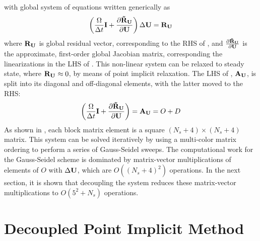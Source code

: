 with global system of equations written generically as
\begin{equation}
  \left( \frac{\Omega}{\Delta t} \mathbf I + \frac{\partial \mathbf{\tilde{R}_{\mathbf U}}}{\partial \mathbf U} \right)\Delta \mathbf U = \mathbf R_{{\mathbf U}_{}}
  \label{fc-global}
\end{equation}
where $\mathbf R_{{\mathbf U}_{}}$ is global residual vector, corresponding to the RHS of
, and $\frac{\partial \mathbf{\tilde{R}_{\mathbf U}}}{\partial \mathbf U}$ is the approximate, first-order global
Jacobian matrix, corresponding the linearizations in the LHS of
. This non-linear system can be relaxed to steady state, where
$\mathbf R_{{\mathbf U}_{}} \approx 0$, by means of point implicit relaxation.  The LHS of
, $\mathbf A_{\mathbf U}$, is split into its diagonal and off-diagonal
elements, with the latter moved to the RHS:
\begin{equation}
  \left( \frac{\Omega}{\Delta t} \mathbf I + \frac{\partial \mathbf{\tilde{R}_{\mathbf U}}}{\partial \mathbf U} \right) = 
  \mathbf A_{\mathbf U} = O+D
  \label{decomp-jac}
\end{equation}
As shown in , each block matrix element is a square
$(N_s+4)\times(N_s+4)$ matrix.  This system can be solved iteratively by using a
multi-color matrix ordering to perform a series of Gauss-Seidel sweeps. The
computational work for the Gauss-Seidel scheme is dominated by matrix-vector
multiplications of elements of $O$ with $\Delta \mathbf U$, which are $O((N_s + 4)^2)$
operations.  In the next section, it is shown that decoupling the system reduces
these matrix-vector multiplications to $O(5^2 + N_s)$ operations.

\section{Decoupled Point Implicit Method}

